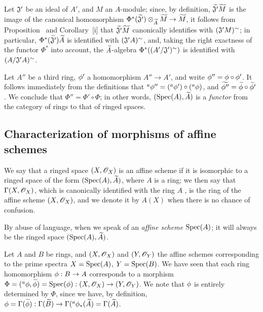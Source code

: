 \begin{env}[1.6.9]
\label{1.1.6.9}
Let $\mathfrak{J}'$ be an ideal of $A'$, and $M$ an $A$-module;
since, by definition, ${\widetilde{\mathfrak{J}'}}{\widetilde{M}}$ is the image of the canonical homomorphism $\Phi^*(\wt{\fk{J}'})\otimes_\wt{A}\wt{M}\to\wt{M}$, it
follows from Proposition~ and Corollary~[i] that
${\widetilde{\mathfrak{J}'}}{\widetilde{M}}$ canonically identifies with $(\mathfrak{J}' M)^\sim$;
in particular, $\Phi^*({\widetilde{\mathfrak{J}'}}){\widetilde{A}}$ is identified with $(\mathfrak{J}' A)^\sim$, and, taking the right exactness of the functor $\Phi^*$ into account,
the ${\widetilde{A}}$-algebra $\Phi^*((A'/\mathfrak{J}')^\sim)$ is identified with $(A/\mathfrak{J}' A)^\sim$.
\end{env}

\begin{env}[1.6.10]
\label{1.1.6.10}
Let $A''$ be a third ring, $\phi'$ a homomorphism $A''\to A'$, and write $\phi''=\phi\circ\phi'$.
It follows immediately from the definitions that ${}^a\phi''=({}^a\phi')\circ({}^a\phi)$, and ${\widetilde{\phi''}}={\widetilde{\phi}}\circ{\widetilde{\phi'}}$ . We conclude that $\Phi''=\Phi'\circ\Phi$;
in other words, $({\mathop{\mathrm{Spec}}\nolimits}(A),{\widetilde{A}})$ is a \emph{functor} from the category of rings to that of ringed spaces.
\end{env}

\subsection{Characterization of morphisms of affine schemes}
\label{subsection:morphisms-affine-schemes}

\begin{defn}[1.7.1]
\label{1.1.7.1}
We say that a ringed space $(X,\mathscr{O}_X)$ is an affine scheme if it is isomorphic to a ringed space of the form $({\mathop{\mathrm{Spec}}\nolimits}(A),{\widetilde{A}})$, where $A$ is a ring;
we then say that $\Gamma(X,\mathscr{O}_X)$, which is canonically identified with the ring $A$ , is the ring of the affine scheme $(X,\mathscr{O}_X)$, and we denote it by $A(X)$ when there is no chance of confusion.
\end{defn}

By abuse of language, when we speak of an \emph{affine scheme ${\mathop{\mathrm{Spec}}\nolimits}(A)$};
it will always be the ringed space $({\mathop{\mathrm{Spec}}\nolimits}(A),{\widetilde{A}})$.

\begin{env}[1.7.2]
\label{1.1.7.2}
Let $A$ and $B$ be rings, and $(X,\mathscr{O}_X)$ and $(Y,\mathscr{O}_Y)$ the affine schemes corresponding to the prime spectra $X={\mathop{\mathrm{Spec}}\nolimits}(A)$, $Y={\mathop{\mathrm{Spec}}\nolimits}(B)$.
We have seen  that each ring homomorphism $\vphi:B\to A$ corresponds to a morphism $\Phi=({}^a\vphi,\wt{\vphi})=\Spec(\vphi):(X,\OO_X)\to(Y,\OO_Y)$.
We note that $\phi$ is entirely determined by $\Phi$, since we have, by definition, $\vphi=\Gamma(\wt{\vphi}):\Gamma(\wt{B})\to\Gamma({}^a\vphi_*(\wt{A})=\Gamma(\wt{A})$.
\end{env}

